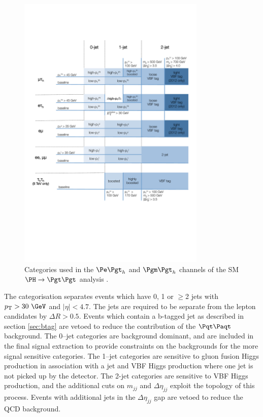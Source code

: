 \begin{figure}[htb]
\begin{center}
    \includegraphics[width=0.8\textwidth]
      {plots/htt-sm/categories_2012.pdf}
\end{center}
\caption[Categories used in the $\etau$ and $\mutau$ channels of the SM
 $\HToTauTau$ analysis.]{
 Categories used in the $\etau$ and $\mutau$ channels of the SM
 $\HToTauTau$ analysis \cite{HIG-13-004}.  
}
\label{fig:smcategories}
\end{figure}

The categorisation separates events which have 0, 1 or $\geq$2 jets with $\pt > 30~\GeV$
and $|\eta| < 4.7$. The jets are required to be separate from the lepton
candidates by $\Delta R > 0.5$. Events which contain a b-tagged jet as described in section
\ref{sec:btag} are vetoed to reduce the contribution of the $\ttbar$ background. 
The 0--jet categories are background dominant, and are included in the final
signal extraction to provide constraints on the backgrounds for the more signal
sensitive categories. The 1--jet categories are sensitive to gluon fusion Higgs
production in association with a jet and \ac{VBF} Higgs production where one jet is
not picked up by the detector. The 2-jet categories are sensitive to
\ac{VBF} Higgs production, and the additional cuts on $m_{jj}$ and $\Delta
\eta_{jj}$ exploit the topology of this process. Events with additional jets in
the $\Delta \eta_{jj}$ gap are vetoed to reduce the \ac{QCD} background.

